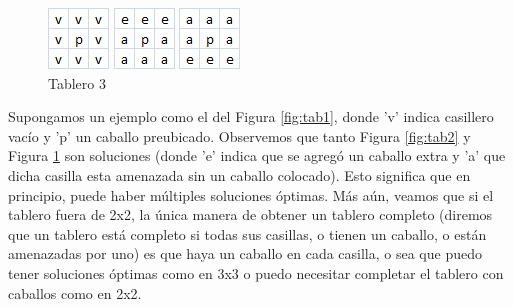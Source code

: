 \begin{figure}[!htb]
  \includegraphics[scale=1]{imagenes/tab1.png}
  \caption{Tablero 1}\label{fig:tab1}
\endminipage\hfill
{}
  \includegraphics[scale=1]{imagenes/tab2.png}
  \caption{Tablero 2}\label{fig:tab2}
\endminipage\hfill
{}%
  \includegraphics[scale=1]{imagenes/tab3.png}
  \caption{Tablero 3}\label{fig:tab3}
\endminipage
\end{figure}




Supongamos un ejemplo como el del Figura \ref{fig:tab1}, donde 'v' indica casillero vacío y 'p' un caballo preubicado. Observemos que tanto Figura \ref{fig:tab2} y Figura \ref{fig:tab3} son soluciones (donde 'e' indica que se agregó un caballo extra y 'a' que dicha casilla esta amenazada sin un caballo colocado). Esto significa que en principio, puede haber múltiples soluciones óptimas. Más aún, veamos que si el tablero fuera de 2x2, la única manera de obtener un tablero completo (diremos que un tablero está completo si todas sus casillas, o tienen un caballo, o están amenazadas por uno) es que haya un caballo en cada casilla, o sea que puedo tener soluciones óptimas como en 3x3 o puedo necesitar completar el tablero con caballos como en 2x2. 

